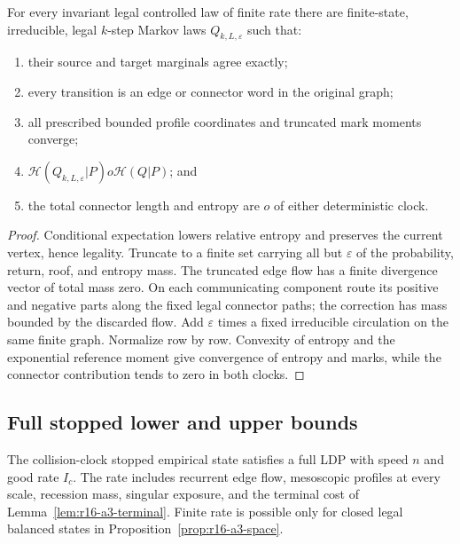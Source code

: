\begin{theorem}
\label{thm:r16-a3-markovization}
For every invariant legal controlled law of finite rate there are finite-state,
irreducible, legal \(k\)-step Markov laws \(Q_{k,L,\varepsilon}\) such that:
\begin{enumerate}[label=(\roman*)]
\item their source and target marginals agree exactly;
\item every transition is an edge or connector word in the original graph;
\item all prescribed bounded profile coordinates and truncated mark moments
converge;
\item
\(\mathcal H(Q_{k,L,\varepsilon}|P)	o\mathcal H(Q|P)\); and
\item the total connector length and entropy are \(o\) of either deterministic
clock.
\end{enumerate}
\end{theorem}

\begin{proof}
Conditional expectation lowers relative entropy and preserves the current
vertex, hence legality.  Truncate to a finite set carrying all but
\(\varepsilon\) of the probability, return, roof, and entropy mass.  The
truncated edge flow has a finite divergence vector of total mass zero.  On
each communicating component route its positive and negative parts along the
fixed legal connector paths; the correction has mass bounded by the discarded
flow.  Add \(\varepsilon\) times a fixed irreducible circulation on the same
finite graph.  Normalize row by row.  Convexity of entropy and the exponential
reference moment give convergence of entropy and marks, while the connector
contribution tends to zero in both clocks.
\end{proof}

\subsection{Full stopped lower and upper bounds}

\begin{theorem}
\label{thm:r16-a3-collision}
The collision-clock stopped empirical state satisfies a full LDP with speed
\(n\) and good rate \(I_c\).  The rate includes recurrent edge flow,
mesoscopic profiles at every scale, recession mass, singular exposure, and the
terminal cost of Lemma~\ref{lem:r16-a3-terminal}.  Finite rate is possible only
for closed legal balanced states in
Proposition~\ref{prop:r16-a3-space}.
\end{theorem}

